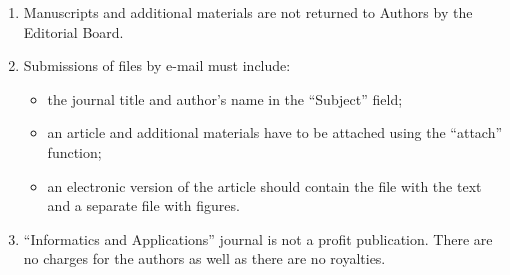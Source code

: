 {{\begin{enumerate}[1.]
\noindent
\textbf{State standards and patents:}

GOST 8.586.5-2005. 2007. Metodika vypolneniya izmereniy. Izmerenie raskhoda i kolichestva 
zhidkostey i gazov s 
pomoshch'yu standartnykh suzhayushchikh ustroystv [Method of measurement. 
Measurement of flow rate and volume of liquids and gases by means of orifice devices]. M.: 
Standardinform 
Publs. 10~p.


. 
2006. Sposob orientirovaniya po krenu letatel'nogo 
apparata s opti\-che\-skoy golovkoy 
samonavedeniya [The way to orient on the roll of aircraft with optical homing head]. 
Patent RF No.\,2280590.

References in Latin transcription are presented in the original language.

References in the text are numbered according to the order of their
first appearance; the number is 
placed in square brackets. All items from the reference list should be
cited.\\[-13.5pt]

\item Manuscripts and additional materials are not returned to Authors by the Editorial Board.\\[-13.5pt]

\item Submissions of files by e-mail must include:\\[-13.5pt]
\begin{itemize}
\item   the journal title and author's name in the ``Subject'' field; \\[-13.5pt]
\item   an article and additional materials have to be attached using the ``attach'' function;\\[-13.5pt]
\item   an electronic version of the article should contain the file with the text and a separate file 
with figures.\\[-13.5pt]
\end{itemize}

\item ``Informatics and Applications'' journal is not a profit publication. There are no 
charges for the authors as well as there are no royalties.\\[-13.5pt]
\end{enumerate}

}}
